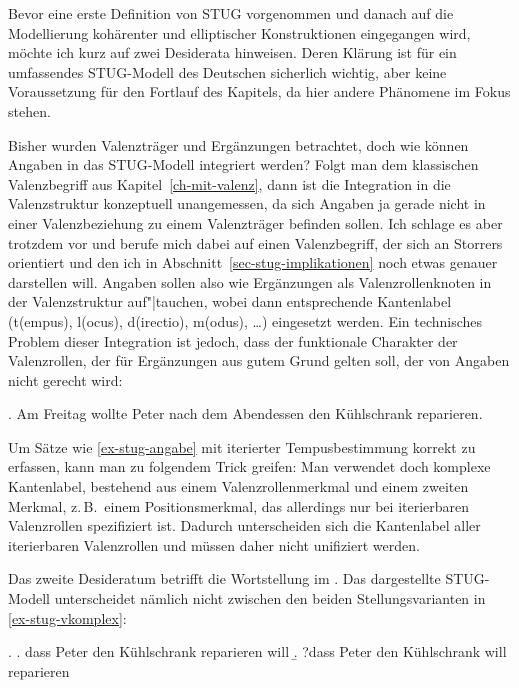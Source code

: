 Bevor eine erste Definition von STUG vorgenommen und danach auf die Modellierung kohärenter und elliptischer Konstruktionen eingegangen wird, möchte ich kurz auf zwei Desiderata hinweisen. Deren Klärung ist für ein umfassendes STUG-Modell des Deutschen sicherlich wichtig, aber keine Voraussetzung für den Fortlauf des Kapitels, da hier andere Phänomene im Fokus stehen.

Bisher wurden Valenzträger und Ergänzungen betrachtet, doch wie können Angaben in das STUG-Modell integriert werden? Folgt man dem klassischen Valenzbegriff aus Kapitel~\ref{ch-mit-valenz}, dann ist die Integration in die Valenzstruktur konzeptuell unangemessen, da sich Angaben ja gerade nicht in einer Valenzbeziehung zu einem Valenzträger befinden sollen. Ich schlage es aber trotzdem vor und berufe mich dabei auf einen Valenzbegriff, der sich an Storrers  orientiert und den ich in Abschnitt~\ref{sec-stug-implikationen} noch etwas genauer darstellen will. Angaben sollen also wie Ergänzungen als Valenzrollenknoten in der Valenzstruktur auf"|tauchen, wobei dann entsprechende Kantenlabel ({\sc t(empus)}, {\sc l(ocus)}, {\sc d(irectio)}, {\sc m(odus)}, \ldots) eingesetzt werden. Ein technisches Problem dieser Integration ist jedoch, dass der funktionale Charakter der Valenzrollen, der für Ergänzungen aus gutem Grund gelten soll, der  von Angaben nicht gerecht wird:

\ex. \label{ex-stug-angabe} Am Freitag wollte Peter nach dem Abendessen den Kühlschrank reparieren.

Um Sätze wie \ref{ex-stug-angabe} mit iterierter Tempusbestimmung korrekt zu erfassen, kann man zu folgendem Trick greifen: Man verwendet doch komplexe Kantenlabel, bestehend aus einem Valenzrollenmerkmal und einem zweiten  Merkmal, z.\,B.\ einem Positionsmerkmal, das allerdings nur bei iterierbaren Valenzrollen spezifiziert ist. Dadurch unterscheiden sich die Kantenlabel aller iterierbaren Valenzrollen und müssen daher nicht unifiziert werden.      

Das zweite Desideratum betrifft die Wortstellung im . Das dargestellte STUG-Modell unterscheidet nämlich nicht zwischen den beiden Stellungsvarianten in \ref{ex-stug-vkomplex}:

\ex. \label{ex-stug-vkomplex}
\a. dass Peter den Kühlschrank reparieren will 
\b. ?dass Peter den Kühlschrank will reparieren\label{ex-stug-vkomplex-b} 

